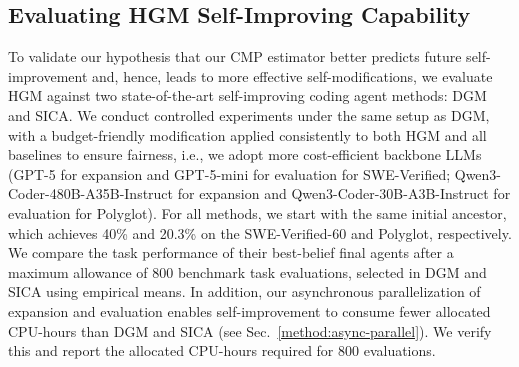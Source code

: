 \documentclass{article}
\begin{document}
\subsection{Evaluating HGM Self-Improving Capability}
\label{exp:eval-self-improv}
To validate our hypothesis that our $\mathrm{CMP}$ estimator better predicts future self-improvement and, hence, leads to more effective self-modifications, we evaluate HGM against two state-of-the-art self-improving coding agent methods: DGM and SICA. We conduct controlled experiments under the same setup as DGM, with a budget-friendly modification applied consistently to both HGM and all baselines to ensure fairness, i.e., we adopt more cost-efficient backbone LLMs (GPT-5 for expansion and GPT-5-mini for evaluation for SWE-Verified; Qwen3-Coder-480B-A35B-Instruct for expansion and Qwen3-Coder-30B-A3B-Instruct for evaluation for Polyglot). For all methods, we start with the same initial ancestor, which achieves 40\% and 20.3\% on the SWE-Verified-60 and Polyglot, respectively. 
We compare the task performance of their best-belief final agents after a maximum allowance of 800 benchmark task evaluations, selected in DGM and SICA using empirical means.
In addition, our asynchronous parallelization of expansion and evaluation enables self-improvement to consume fewer allocated CPU-hours than DGM and SICA (see Sec.~\ref{method:async-parallel}). We verify this and report the allocated CPU-hours required for 800 evaluations.
\end{document}
